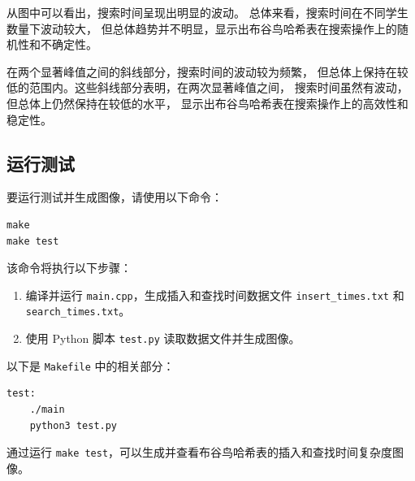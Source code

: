 \documentclass[UTF8]{ctexart}
\begin{document}
从图中可以看出，搜索时间呈现出明显的波动。
总体来看，搜索时间在不同学生数量下波动较大，
但总体趋势并不明显，显示出布谷鸟哈希表在搜索操作上的随机性和不确定性。

在两个显著峰值之间的斜线部分，搜索时间的波动较为频繁，
但总体上保持在较低的范围内。这些斜线部分表明，在两次显著峰值之间，
搜索时间虽然有波动，但总体上仍然保持在较低的水平，
显示出布谷鸟哈希表在搜索操作上的高效性和稳定性。

\subsection{运行测试}
要运行测试并生成图像，请使用以下命令：

\begin{verbatim}
make
make test
\end{verbatim}

\noindent 该命令将执行以下步骤：
\begin{enumerate}
    \item 编译并运行 \texttt{main.cpp}，生成插入和查找时间数据文件 \texttt{insert\_times.txt} 和 \texttt{search\_times.txt}。
    \item 使用 Python 脚本 \texttt{test.py} 读取数据文件并生成图像。
\end{enumerate}

\noindent 以下是 \texttt{Makefile} 中的相关部分：

\begin{verbatim}
test:
    ./main
    python3 test.py
\end{verbatim}

通过运行 \texttt{make test}，可以生成并查看布谷鸟哈希表的插入和查找时间复杂度图像。
\end{document}
